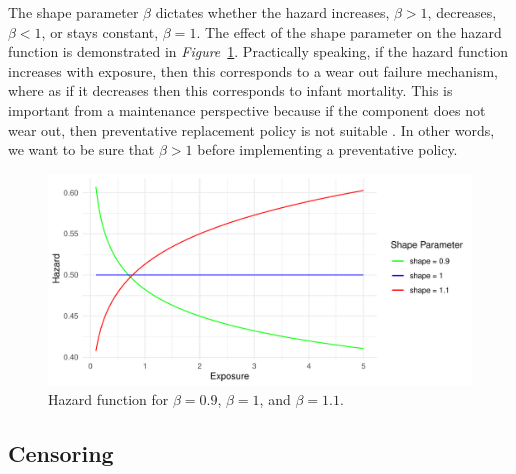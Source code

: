 %
%
%
%
The shape parameter $\beta$ dictates whether the hazard increases, $\beta > 1$, decreases, $\beta < 1$, or stays constant, $\beta = 1$. The effect of the shape parameter on the hazard function is demonstrated in \textit{Figure}~\ref{fig:hazard_function_demo}. Practically speaking, if the hazard function increases with exposure, then this corresponds to a wear out failure mechanism, where as if it decreases then this corresponds to infant mortality. This is important from a maintenance perspective because if the component does not wear out, then preventative replacement policy is not suitable \citep{jardine2013}. In other words, we want to be sure that $\beta > 1$ before implementing a preventative policy.

\begin{figure}[h]
    \centering
    \includegraphics[width=1\textwidth]{./figures/hazard_func_demo.pdf}
    \caption{Hazard function for $\beta = 0.9$, $\beta = 1$, and $\beta = 1.1$.}
    \label{fig:hazard_function_demo}
\end{figure}

\subsection{Censoring}


